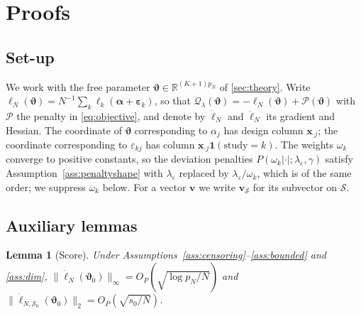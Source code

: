 \documentclass[11pt]{article}
\newtheorem{lemma}{Lemma}[section]
\theoremstyle{remark}
\numberwithin{equation}{section}
\newcommand{\bx}{\mathbf{x}}
\newcommand{\balpha}{\boldsymbol{\alpha}}
\newcommand{\beps}{\boldsymbol{\varepsilon}}
\newcommand{\bvt}{\boldsymbol{\vartheta}}
\begin{document}


\clearpage
\appendix
\section{Proofs}
\label{app:proofs}

\subsection{Set-up}
We work with the free parameter $\bvt\in\mathbb R^{(K+1)p_N}$ of \cref{sec:theory}.
Write $\ell_N(\bvt)=N^{-1}\sum_k\ell_k(\balpha+\beps_k)$, so that
$\mathcal Q_\lambda(\bvt)=-\ell_N(\bvt)+\mathcal P(\bvt)$ with $\mathcal P$ the penalty in
\eqref{eq:objective}, and denote by $\dot\ell_N$ and $\ddot\ell_N$ its gradient and
Hessian. The coordinate of $\bvt$ corresponding to $\alpha_j$ has design column
$\bx_{\cdot j}$; the coordinate corresponding to $\varepsilon_{kj}$ has column
$\bx_{\cdot j}\mathbf 1(\text{study}=k)$. The weights $\omega_k$ converge to positive
constants, so the deviation penalties $P(\omega_k|\cdot|;\lambda_\varepsilon,\gamma)$
satisfy Assumption~\ref{ass:penaltyshape} with $\lambda_\varepsilon$ replaced by
$\lambda_\varepsilon/\omega_k$, which is of the same order; we suppress $\omega_k$
below. For a vector $\mathbf v$ we write $\mathbf v_{\mathcal S}$ for its
subvector on $\mathcal S$.

\subsection{Auxiliary lemmas}

\begin{lemma}[Score]\label{lem:score_rate}
Under Assumptions~\ref{ass:censoring}--\ref{ass:bounded} and \ref{ass:dim},
$\|\dot\ell_N(\bvt_0)\|_\infty=O_P(\sqrt{\log p_N/N})$ and
$\|\dot\ell_{N,\mathcal S_0}(\bvt_0)\|_2=O_P(\sqrt{s_0/N})$.
\end{lemma}
\end{document}
